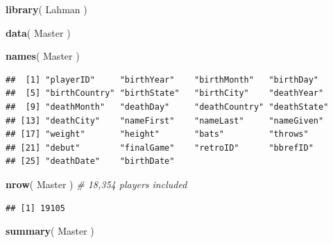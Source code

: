 \documentclass[]{book}
\newenvironment{Shaded}{\begin{snugshade}}{\end{snugshade}}
\newcommand{\CommentTok}[1]{\textcolor[rgb]{0.56,0.35,0.01}{\textit{#1}}}
\newcommand{\KeywordTok}[1]{\textcolor[rgb]{0.13,0.29,0.53}{\textbf{#1}}}
\newcommand{\NormalTok}[1]{#1}
\theoremstyle{definition}
\theoremstyle{definition}
\theoremstyle{definition}
\theoremstyle{remark}
\begin{document}
\begin{Shaded}
\begin{Highlighting}[]
\KeywordTok{library}\NormalTok{( Lahman )}

\KeywordTok{data}\NormalTok{( Master )}

\KeywordTok{names}\NormalTok{( Master )}
\end{Highlighting}
\end{Shaded}

\begin{verbatim}
##  [1] "playerID"     "birthYear"    "birthMonth"   "birthDay"    
##  [5] "birthCountry" "birthState"   "birthCity"    "deathYear"   
##  [9] "deathMonth"   "deathDay"     "deathCountry" "deathState"  
## [13] "deathCity"    "nameFirst"    "nameLast"     "nameGiven"   
## [17] "weight"       "height"       "bats"         "throws"      
## [21] "debut"        "finalGame"    "retroID"      "bbrefID"     
## [25] "deathDate"    "birthDate"
\end{verbatim}

\begin{Shaded}
\begin{Highlighting}[]
\KeywordTok{nrow}\NormalTok{( Master )  }\CommentTok{# 18,354 players included}
\end{Highlighting}
\end{Shaded}

\begin{verbatim}
## [1] 19105
\end{verbatim}

\begin{Shaded}
\begin{Highlighting}[]
\KeywordTok{summary}\NormalTok{( Master )}
\end{Highlighting}
\end{Shaded}
\end{document}
